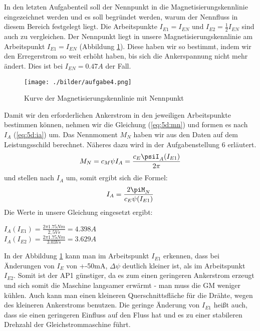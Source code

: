 \section{}
In den letzten Aufgabenteil soll der Nennpunkt in die Magnetisierungskennlinie eingezeichnet werden und es soll begründet werden, warum der Nennfluss in diesem Bereich festgelegt liegt. Die Arbeitspunkte $ I_{E1} = I_{EN} $ und $ I_{E2} = \frac{1}{2} I_{EN} $ sind auch zu vergleichen.
Der Nennpunkt liegt in unsere Magnetisierungskennlinie am Arbeitspunkt $ I_{E1} = I_{EN} $ (Abbildung \ref{fig:5d:kennlineNenn}). Diese haben wir so bestimmt, indem wir den Erregerstrom so weit erhöht haben, bis sich die Ankerspannung nicht mehr ändert. Dies ist bei $ I_{EN} = 0.47A $ der Fall.
\begin{figure}[h]
	\centering
	\texttt{[image: ./bilder/aufgabe4.png]}
	\caption{Kurve der Magnetisierungskennlinie mit Nennpunkt}
	\label{fig:5d:kennlineNenn}
\end{figure}

Damit wir den erforderlichen Ankerstrom in den jeweiligen Arbeitspunkte bestimmen können, nehmen wir die Gleichung (\ref{eq:5d:mn}) und formen es nach $ I_{A} $ (\ref{eq:5d:ia}) um. Das Nennmoment $ M_{N} $ haben wir aus den Daten auf dem Leistungsschild berechnet. Näheres dazu wird in der Aufgabenstellung 6 erläutert.
\begin{equation}
	M_{N} = c_{M}\psi I_{A} = \frac{c_{E}\psiI_{A}(I_{E1})}{2\pi} 
	\label{eq:5d:mn}
\end{equation} und stellen nach $ I_{A} $ um, somit ergibt sich die Formel:
\begin{equation}
	I_{A} = \frac{2\piM_{N}}{c_{E}\psi(I_{E1})}
	\label{eq:5d:ia}
\end{equation}
Die Werte in unsere Gleichung eingesetzt ergibt:
\begin{center}
	$ I_{A}(I_{E1}) = \frac{2\pi1.75Nm}{2,5Vs} = 4.398A $ \\
	$ I_{A}(I_{E2}) = \frac{2\pi1.75Nm}{3.03Vs} = 3.629A $
\end{center}

In der Abbildung \ref{fig:5d:kennlineNenn} kann man im Arbeitspunkt $ I_{E1} $ erkennen, dass bei Änderungen von $ I_{E} $ von +-50mA, $ \Delta\psi $ deutlich kleiner ist, als im Arbeitspunkt $ I_{E2} $. Somit ist der AP1 günstiger, da es zum einen geringeren Ankerstrom erzeugt und sich somit die Maschine langsamer erwärmt - man muss die GM weniger kühlen. Auch kann man einen kleineren Querschnittsfläche für die Drähte, wegen des kleineren Ankerstroms benutzen. Die geringe Änderung von $ I_{E1} $ heißt auch, dass sie einen geringeren Einfluss auf den Fluss hat und es zu einer stabileren Drehzahl der Gleichstrommaschine führt.
